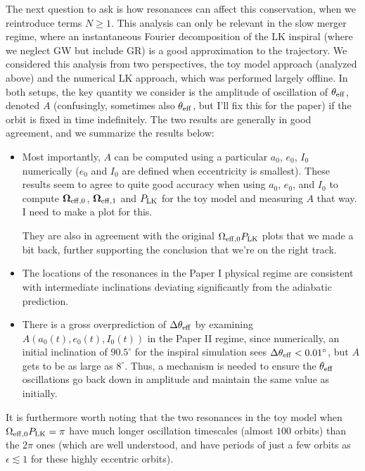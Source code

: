 \documentclass[11pt,
        usenames, %
        dvipsnames %
    ]{article}
\newcommand*{\bm}[1]{\boldsymbol{\mathbf{#1}}}
\newcommand*{\p}[1]{\left(#1\right)}
\begin{document}
The next question to ask is how resonances can affect this conservation, when we
reintroduce terms $N \geq 1$. This analysis can only be relevant in the slow
merger regime, where an instantaneous Fourier decomposition of the LK inspiral
(where we neglect GW but include GR) is a good approximation to the trajectory.
We considered this analysis from two perspectives, the toy model approach
(analyzed above) and the numerical LK approach, which was performed largely
offline. In both setups, the key quantity we consider is the amplitude of
oscillation of $\theta_{\rm eff}$, denoted $A$ (confusingly, sometimes also
$\theta_{\rm eff}$, but I'll fix this for the paper) if the orbit is fixed in
time indefinitely. The two results are generally in good agreement, and we
summarize the results below:
\begin{itemize}
    \item Most importantly, $A$ can be computed using a particular $a_0$, $e_0$,
        $I_0$ numerically ($e_0$ and $I_0$ are defined when eccentricity is
        smallest). These results seem to agree to quite good accuracy when using
        $a_0$, $e_0$, and $I_0$ to compute $\bm{\Omega}_{\rm eff, 0}$,
        $\bm{\Omega}_{\rm eff, 1}$ and $P_{\rm LK}$ for the toy model and
        measuring $A$ that way. I need to make a plot for this.

        They are also in agreement with the original $\Omega_{\rm eff,0} P_{\rm
        LK}$ plots that we made a bit back, further supporting the conclusion
        that we're on the right track.

    \item The locations of the resonances in the Paper I physical regime are
        consistent with intermediate inclinations deviating significantly from
        the adiabatic prediction.

    \item There is a gross overprediction of $\Delta \theta_{\rm eff}$ by
        examining $A\p{a_0(t), e_0(t), I_0(t)}$ in the Paper II regime, since
        numerically, an initial inclination of $90.5^\circ$ for the inspiral
        simulation sees $\Delta \theta_{\rm eff} < 0.01^\circ$, but $A$ gets to
        be as large as $8^\circ$. Thus, a mechanism is needed to ensure the
        $\theta_{\rm eff}$ oscillations go back down in amplitude and maintain
        the same value as initially.
\end{itemize}

It is furthermore worth noting that the two resonances in the toy model when
$\Omega_{\rm eff,0} P_{\rm LK} = \pi$ have much longer oscillation timescales
(almost $100$ orbits) than the $2\pi$ ones (which are well understood, and have
periods of just a few orbits as $\epsilon \lesssim 1$ for these highly eccentric
orbits).
\end{document}
